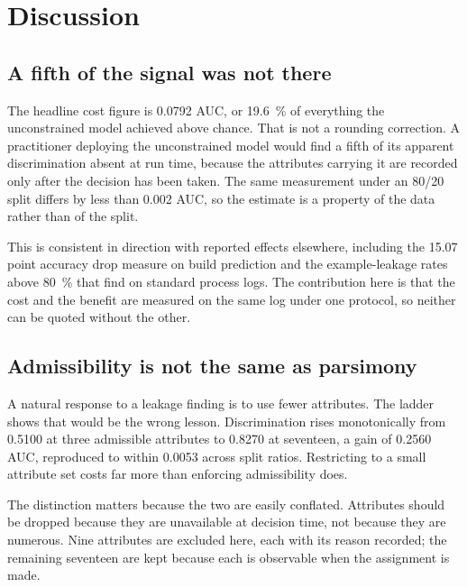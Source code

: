 
\section{Discussion}

\subsection{A fifth of the signal was not there}

The headline cost figure is \num{0.0792} AUC, or \SI{19.6}{\percent} of everything the
unconstrained model achieved above chance. That is not a rounding correction. A practitioner
deploying the unconstrained model would find a fifth of its apparent discrimination absent
at run time, because the attributes carrying it are recorded only after the decision has been
taken. The same measurement under an \num{80}/\num{20} split differs by less than
\num{0.002} AUC, so the estimate is a property of the data rather than of the split.

This is consistent in direction with reported effects elsewhere, including the
\num{15.07} point accuracy drop \citet{mishra2026taxonomy} measure on build prediction and
the example-leakage rates above \SI{80}{\percent} that \citet{abb2024discussion} find on
standard process logs. The contribution here is that the cost and the benefit are measured on
the same log under one protocol, so neither can be quoted without the other.

\subsection{Admissibility is not the same as parsimony}

A natural response to a leakage finding is to use fewer attributes. The ladder shows that
would be the wrong lesson. Discrimination rises monotonically from \num{0.5100} at three
admissible attributes to \num{0.8270} at seventeen, a gain of \num{0.2560} AUC, reproduced to
within \num{0.0053} across split ratios. Restricting to a small attribute set costs far more
than enforcing admissibility does.

The distinction matters because the two are easily conflated. Attributes should be dropped
because they are unavailable at decision time, not because they are numerous. Nine attributes
are excluded here, each with its reason recorded; the remaining seventeen are kept because
each is observable when the assignment is made.

